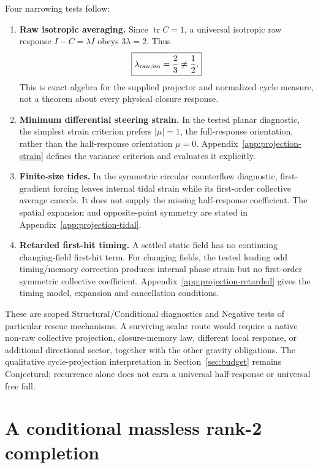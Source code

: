 \documentclass[11pt]{article}
\theoremstyle{plain}
\theoremstyle{remark}
\begin{document}
Four narrowing tests follow:
\begin{enumerate}[leftmargin=*]
 \item \textbf{Raw isotropic averaging.}
 Since $\operatorname{tr}C=1$, a universal isotropic raw response
 $I-C=\lambda I$ obeys $3\lambda=2$.  Thus
 \begin{equation}
  \boxed{\lambda_{\rm raw,iso}=\frac23\ne\frac12.}
  \label{eq:projection-two-thirds}
 \end{equation}
 This is exact algebra for the supplied projector and normalized cycle
 measure, not a theorem about every physical closure response.
 \item \textbf{Minimum differential steering strain.}
 In the tested planar diagnostic, the simplest strain criterion prefers
 $|\mu|=1$, the full-response orientation, rather than the half-response
 orientation $\mu=0$.  Appendix~\ref{app:projection-strain} defines
 the variance criterion and evaluates it explicitly.
 \item \textbf{Finite-size tides.}
 In the symmetric circular counterflow diagnostic, first-gradient forcing
 leaves internal tidal strain while its first-order collective average
 cancels.  It does not supply the missing half-response coefficient.
 The spatial expansion and opposite-point symmetry are stated in
 Appendix~\ref{app:projection-tidal}.
 \item \textbf{Retarded first-hit timing.}
 A settled static field has no continuing changing-field first-hit term.
 For changing fields, the tested leading odd timing/memory correction
 produces internal phase strain but no first-order symmetric collective
 coefficient.  Appendix~\ref{app:projection-retarded} gives the timing
 model, expansion and cancellation conditions.
\end{enumerate}

These are scoped Structural/Conditional diagnostics and Negative tests of
particular rescue mechanisms.  A surviving scalar route would require a
native non-raw collective projection, closure-memory law, different local
response, or additional directional sector, together with the other gravity
obligations.  The qualitative cycle-projection interpretation in
Section~\ref{sec:budget} remains Conjectural; recurrence alone does not earn
a universal half-response or universal free fall.

\section{A conditional massless rank-2 completion}
\label{sec:rank2}
\end{document}
